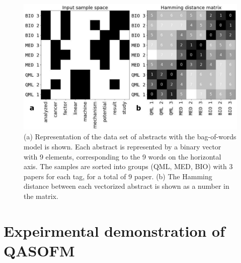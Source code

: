 \documentclass[pra,showkeys,twocolumn,showpacs]{revtex4-1}
\begin{document}
 
%

%

\begin{figure}[t]
\includegraphics[width=0.95\columnwidth]{vectorized_sample.png}
\caption{(a) Representation of the data set of abstracts with the bag-of-words model is shown. Each abstract is represented by a binary vector with 9 elements, corresponding to the 9 words on the horizontal axis. The samples are sorted into groups (QML, MED, BIO) with 3 papers for each tag, for a total of 9 paper.    (b) The Hamming distance between each vectorized abstract is shown as a number in the matrix. 
} 
\label{fig:vectorized_sample}
\end{figure}



















\section{Expeirmental demonstration of QASOFM}
\end{document}
